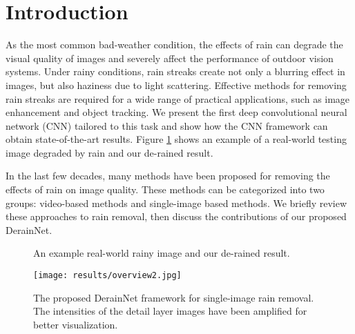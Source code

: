 \documentclass[journal]{IEEEtran}
\begin{document}
\IEEEpeerreviewmaketitle



\section{Introduction}
As the most common bad-weather condition, the effects of rain can degrade the visual quality of images and severely affect the performance of outdoor vision systems. Under rainy conditions, rain streaks create not only a blurring effect in images, but also haziness due to light scattering. Effective methods for removing rain streaks are required for a wide range of practical applications, such as image enhancement and object tracking. We present the first deep convolutional neural network (CNN) tailored to this task and show how the CNN framework can obtain state-of-the-art results. Figure \ref{fig.example} shows an example of a real-world testing image degraded by rain and our de-rained result. 

In the last few decades, many methods have been proposed for removing the effects of rain on image quality. These methods can be categorized into two groups: video-based methods and single-image based methods. We briefly review these approaches to rain removal, then discuss the contributions of our
proposed DerainNet.

\begin{figure}[t!]
\centering
{}
\caption{An example real-world rainy image and our de-rained result.} \label{fig.example}
\end{figure}



\begin{figure*}[ht!]
\centering
\texttt{[image: results/overview2.jpg]}
\caption{The proposed DerainNet framework for single-image rain removal. The intensities of the detail layer images have been amplified for better visualization. } \label{fig.overview}
\end{figure*}
\end{document}
